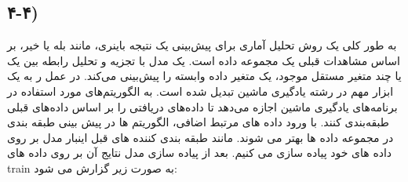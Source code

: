 \documentclass{article}
\begin{document}
\subsection{۴-۴) }
به طور کلی  یک روش تحلیل آماری برای پیش‌بینی یک نتیجه باینری، مانند بله یا خیر، بر اساس مشاهدات قبلی یک مجموعه داده است.
یک مدل  با تجزیه و تحلیل رابطه بین یک یا چند متغیر مستقل موجود، یک متغیر داده وابسته را پیش‌بینی می‌کند.
در عمل ر به یک ابزار مهم در رشته یادگیری ماشین تبدیل شده است.  به الگوریتم‌های مورد استفاده در برنامه‌های یادگیری ماشین اجازه می‌دهد تا داده‌های دریافتی را بر اساس داده‌های قبلی طبقه‌بندی کنند. با ورود داده های مرتبط اضافی، الگوریتم ها در پیش بینی طبقه بندی در مجموعه داده ها بهتر می شوند.
مانند طبقه بندی کننده های قبل اینبار مدل  بر روی داده های خود پیاده سازی می کنیم.\newline
بعد از پیاده سازی مدل نتایج آن بر روی داده های train به صورت زیر گزارش می شود:\newline
\begin{table}[h]
	\centering
	\caption{نتایج  بر روی دیتای train} \label{foo13}
\end{table}
\end{document}
